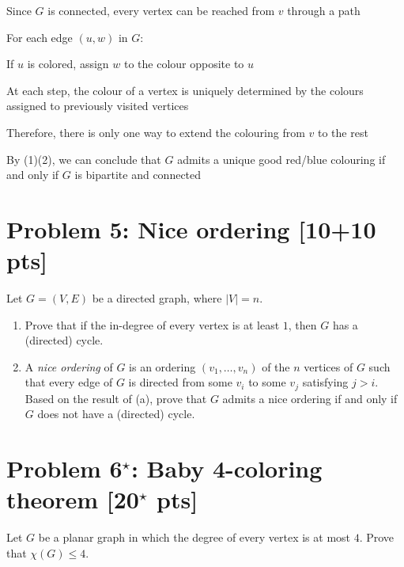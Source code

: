 \documentclass[11pt,twoside]{article}
\newcommand{\problem}[1]{\section*{Problem #1}}
\begin{document}
Since $G$ is connected, every vertex can be reached from $v$ through a path

For each edge $(u,w)$ in $G$:

\qquad If $u$ is colored, assign $w$ to the colour opposite to $u$

At each step, the colour of a vertex is uniquely determined by the colours assigned to previously visited vertices

Therefore, there is only one way to extend the colouring from $v$ to the rest

\hspace*{\fill}

By (1)(2), we can conclude that $G$ admits a unique good red/blue colouring if and only if $G$ is bipartite and connected




\problem{5: Nice ordering [10+10 pts]}
Let $G = (V,E)$ be a directed graph, where $|V| = n$.
\begin{enumerate}
    \item Prove that if the in-degree of every vertex is at least $1$, then $G$ has a (directed) cycle.
    \item A \textit{nice ordering} of $G$ is an ordering $(v_1,\dots,v_n)$ of the $n$ vertices of $G$ such that every edge of $G$ is directed from some $v_i$ to some $v_j$ satisfying $j>i$.
    Based on the result of (a), prove that $G$ admits a nice ordering if and only if $G$ does not have a (directed) cycle.
\end{enumerate}



\problem{6$^\star$: Baby 4-coloring theorem [20$^\star$ pts]}



Let $G$ be a planar graph in which the degree of every vertex is at most $4$.
Prove that $\chi(G) \leq 4$.
\end{document}
